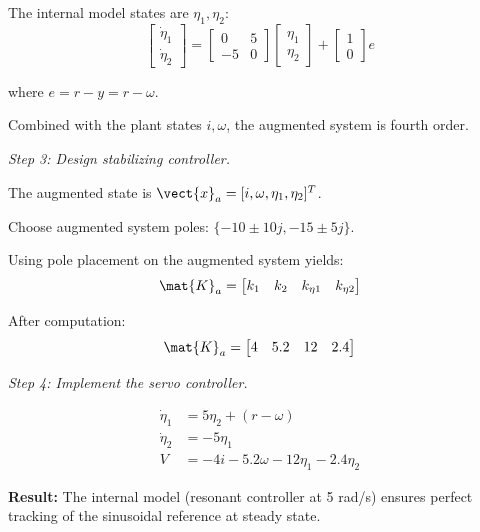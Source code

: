 The internal model states are $\eta_1, \eta_2$:
\begin{equation}
\begin{bmatrix} \dot{\eta}_1 \\ \dot{\eta}_2 \end{bmatrix} =
\begin{bmatrix} 0 & 5 \\ -5 & 0 \end{bmatrix}
\begin{bmatrix} \eta_1 \\ \eta_2 \end{bmatrix} +
\begin{bmatrix} 1 \\ 0 \end{bmatrix} e
\end{equation}

where $e = r - y = r - \omega$.

Combined with the plant states $i, \omega$, the augmented system is fourth order.

\textit{Step 3: Design stabilizing controller.}

The augmented state is $\vect{x}_a = [i, \omega, \eta_1, \eta_2]^T$.

Choose augmented system poles: $\{-10 \pm 10j, -15 \pm 5j\}$.

Using pole placement on the augmented system yields:
\begin{equation}
\mat{K}_a = \begin{bmatrix} k_1 & k_2 & k_{\eta 1} & k_{\eta 2} \end{bmatrix}
\end{equation}

After computation:
\begin{equation}
\mat{K}_a = \begin{bmatrix} 4 & 5.2 & 12 & 2.4 \end{bmatrix}
\end{equation}

\textit{Step 4: Implement the servo controller.}

\begin{align}
\dot{\eta}_1 &= 5\eta_2 + (r - \omega) \\
\dot{\eta}_2 &= -5\eta_1 \\
V &= -4i - 5.2\omega - 12\eta_1 - 2.4\eta_2
\end{align}

\textbf{Result:} The internal model (resonant controller at 5 rad/s) ensures perfect tracking of the sinusoidal reference at steady state.

